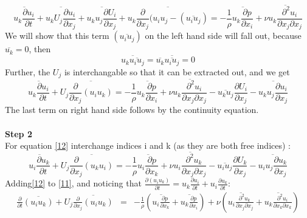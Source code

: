 \documentclass[11pt]{article}
\begin{document}
{\[
\overline{u_{k}\frac{\partial u_{i}}{\partial t}}+\overline{u_{k}U_{j}\frac{\partial u_{i}}{\partial x_{j}}}+\overline{u_{k}u_{j}\frac{\partial U_{i}}{\partial x_{j}}}+\overline{u_{k}\frac{\partial}{\partial x_{j}}(u_{i}u_{j}-(\overline{u_{i}u_{j}})}=-\frac{1}{\rho}\overline{u_{k}\frac{\partial p}{\partial x_{i}}}+\nu\overline{u_{k}\frac{\partial^{2}u_{i}}{\partial x_{j}\partial x_{j}}}
\]
We will show that this term $(\overline{u_{i}u_{j}})$ on the left
hand side will fall out, because $\overline{u_{k}}=0$, then 
\[
\overline{u_{k}\overline{u_{i}u_{j}}}=\overline{u_{k}}\overline{\overline{u_{i}u_{j}}}=0
\]
Further, the $U_{j}$ is interchangable so that it can be extracted
out, and we get
\begin{equation}
\label{12}
\overline{u_{k}\frac{\partial u_{i}}{\partial t}}+U_{j}\overline{\frac{\partial}{\partial x_{j}}(u_{i}u_{k})}=-\frac{1}{\rho}\overline{u_{k}\frac{\partial p}{\partial x_{i}}}+\nu\overline{u_{k}\frac{\partial^{2}u_{i}}{\partial x_{j}\partial x_{j}}}-\overline{u_{k}u_{j}}\frac{\partial U_{i}}{\partial x_{j}}-\overline{u_{k}u_{j}\frac{\partial u_{i}}{\partial x_{j}}}
\end{equation}
The last term on right hand side follows by the continuity equation.
\\\\
\textbf{Step 2} \\
For equation \eqref{12} interchange indices i and k (as they are both free
indices) :
\begin{equation}
\label{13}
\overline{u_{i}\frac{\partial u_{k}}{\partial t}}+U_{j}\overline{\frac{\partial}{\partial x_{j}}(u_{k}u_{i})}=-\frac{1}{\rho}\overline{u_{i}\frac{\partial p}{\partial x_{k}}}+\nu\overline{u_{i}\frac{\partial^{2}u_{k}}{\partial x_{j}\partial x_{j}}}-\overline{u_{i}u_{j}}\frac{\partial U_{k}}{\partial x_{j}}-\overline{u_{i}u_{j}\frac{\partial u_{k}}{\partial x_{j}}}
\end{equation}
Adding\eqref{12} to \eqref{11}, and noticing that $\frac{\partial(u_{i}u_{k})}{\partial t}=u_{k}\frac{\partial u_{i}}{\partial t}+u_{i}\frac{\partial u_{k}}{\partial t}$:
\begin{eqnarray}
\label{14}
\frac{\partial}{\partial t}\overline{(u_{i}u_{k})}+U_{j}\overline{\frac{\partial}{\partial x_{j}}(u_{i}u_{k})} & = & -\frac{1}{\rho}\left(\overline{u_{i}\frac{\partial p}{\partial x_{k}}}+\overline{u_{k}\frac{\partial p}{\partial x_{i}}}\right)+\nu\left(\overline{u_{i}\frac{\partial^{2}u_{k}}{\partial x_{j}\partial x_{j}}}+\overline{u_{k}\frac{\partial^{2}u_{i}}{\partial x_{k}\partial x_{k}}}\right)\nonumber \\

\end{eqnarray}}
\end{document}
